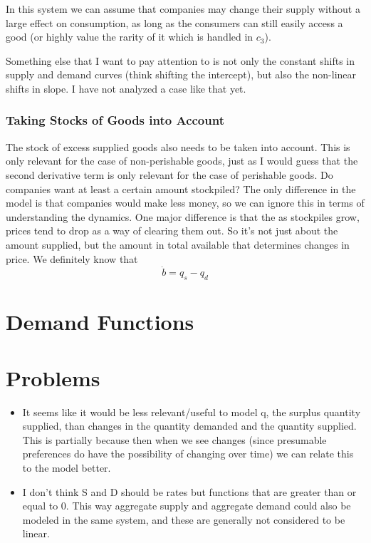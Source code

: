 \documentclass{article}
\begin{document}
In this system we can assume that companies may change their supply without a large effect on consumption, as long as the consumers can still easily access a good (or highly value the rarity of it which is handled in $c_3$).

Something else that I want to pay attention to is not only the constant shifts in supply and demand curves (think shifting the intercept), but also the non-linear shifts in slope. I have not analyzed a case like that yet.

\subsubsection{Taking Stocks of Goods into Account}
The stock of excess supplied goods also needs to be taken into account. This is only relevant for the case of non-perishable goods, just as I would guess that the second derivative term is only relevant for the case of perishable goods. Do companies want at least a certain amount stockpiled? The only difference in the model is that companies would make less money, so we can ignore this in terms of understanding the dynamics. One major difference is that the as stockpiles grow, prices tend to drop as a way of clearing them out. So it's not just about the amount supplied, but the amount in total available that determines changes in price. We definitely know that 
\begin{equation*}
	\dot{b} = q_s - q_d
\end{equation*}

\section{Demand Functions}


\section{Problems}
\begin{itemize}
	\item It seems like it would be less relevant/useful to model q, the surplus quantity supplied, than changes in the quantity demanded and the quantity supplied. This is partially because then when we see changes (since presumable preferences do have the possibility of changing over time) we can relate this to the model better.
	\item I don't think S and D should be rates but functions that are greater than or equal to 0. This way aggregate supply and aggregate demand could also be modeled in the same system, and these are generally not considered to be linear.
\end{itemize}
\end{document}
